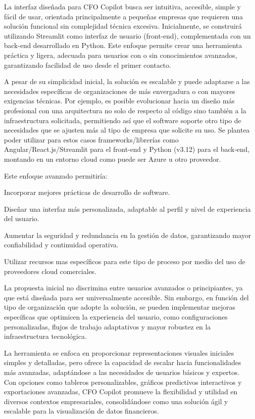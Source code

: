\documentclass[12pt,letterpaper,oneside]{report}
\renewcommand{\_}{\UnderscoreOriginal\allowbreak}
\begin{document}
La interfaz diseñada para CFO Copilot busca ser intuitiva, accesible, simple y fácil de usar, orientada principalmente a pequeñas empresas que requieren una solución funcional sin complejidad técnica excesiva. Inicialmente, se construirá utilizando Streamlit \parencite{Streamlit2025} como interfaz de usuario (front-end), complementada con un back-end desarrollado en Python. Este enfoque permite crear una herramienta práctica y ligera, adecuada para usuarios con o sin conocimientos avanzados, garantizando facilidad de uso desde el primer contacto.

A pesar de su simplicidad inicial, la solución es escalable y puede adaptarse a las necesidades específicas de organizaciones de más envergadura o con mayores exigencias técnicas. Por ejemplo, es posible evolucionar hacia un diseño más profesional con una arquitectura no solo de respecto al código sino también a la infraestructura solicitada, permitiendo así que el software soporte otro tipo de necesidades que se ajusten más al tipo de empresa que solicite su uso. Se plantea poder utilizar para estos casos frameworks/librerías como Angular/React.js/Streamlit para el front-end y Python (v3.12) para el back-end, montando en un entorno cloud como puede ser Azure u otro proveedor.

Este enfoque avanzado permitiría:

Incorporar mejores prácticas de desarrollo de software.

Diseñar una interfaz más personalizada, adaptable al perfil y nivel de experiencia del usuario.

Aumentar la seguridad y redundancia en la gestión de datos, garantizando mayor confiabilidad y continuidad operativa.

Utilizar recursos mas específicos para este tipo de proceso por medio del uso de proveedores cloud comerciales.

La propuesta inicial no discrimina entre usuarios avanzados o principiantes, ya que está diseñada para ser universalmente accesible. Sin embargo, en función del tipo de organización que adopte la solución, se pueden implementar mejoras específicas que optimicen la experiencia del usuario, como configuraciones personalizadas, flujos de trabajo adaptativos y mayor robustez en la infraestructura tecnológica.

La herramienta se enfoca en proporcionar representaciones visuales iniciales simples y detalladas, pero ofrece la capacidad de escalar hacia funcionalidades más avanzadas, adaptándose a las necesidades de usuarios básicos y expertos. Con opciones como tableros personalizables, gráficos predictivos interactivos y exportaciones avanzadas, CFO Copilot promueve la flexibilidad y utilidad en diversos contextos empresariales, consolidándose como una solución ágil y escalable para la visualización de datos financieros.
\end{document}
